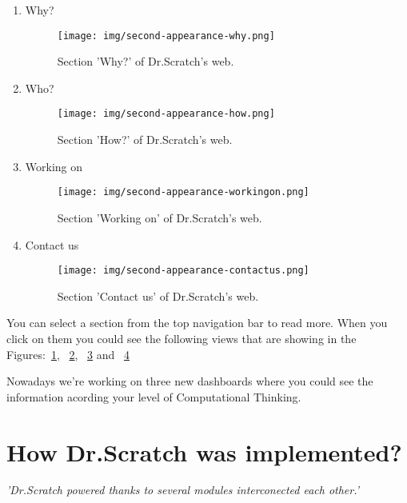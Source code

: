 \documentclass[a4paper, 12pt]{book}
\begin{document}
\begin{enumerate}
   	\item Why?
   	\begin{figure}
	   	\centering
	   	\texttt{[image: img/second-appearance-why.png]}
	   	\caption{Section 'Why?' of Dr.Scratch's web.}
	   	\label{figure:second-appearance-why}
	\end{figure}
   
   	\item Who?
   	\begin{figure}
	   	\centering
	   	\texttt{[image: img/second-appearance-how.png]}
	   	\caption{Section 'How?' of Dr.Scratch's web.}
	   	\label{figure:second-appearance-how}
	\end{figure}
	\item Working on
	\begin{figure}
	   	\centering
	   	\texttt{[image: img/second-appearance-workingon.png]}
	   	\caption{Section 'Working on' of Dr.Scratch's web.}
	   	\label{figure:second-appearance-workingon}
	\end{figure}
	\item Contact us
	\begin{figure}
	   	\centering
	   	\texttt{[image: img/second-appearance-contactus.png]}
	   	\caption{Section 'Contact us' of Dr.Scratch's web.}
	   	\label{figure:second-appearance-contactus}
	\end{figure}
\end{enumerate}

You can select a section from the top navigation bar to read more. When you
click on them you could see the following views that are showing in the
Figures:~\ref{figure:second-appearance-why},
~\ref{figure:second-appearance-how}, 
~\ref{figure:second-appearance-workingon} and 
~\ref{figure:second-appearance-contactus}

Nowadays we're working on three new dashboards where you could see the
information acording your level of Computational Thinking.

\cleardoublepage
\chapter{How Dr.Scratch was implemented?}
\setlength{\parskip}{8mm}
\textsl{'Dr.Scratch powered thanks to several modules interconected each
other.'}
\end{document}
